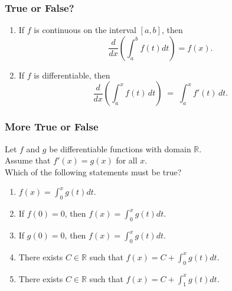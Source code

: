 \begin{frame}[t]
	\fontsize{13}{13}\selectfont
	\frametitle{True or False?}

	\begin{enumerate}
		\item If $f$ is continuous on the interval $[a,b]$, then
			\[
				\frac{d}{dx}\left( \int_{a}^{b}f(t)dt\right)=f(x).
			\]

			\vspace{4mm}

		\item If $f$ is differentiable, then
			\[
				\frac{d}{dx}\left(\int_{a}^{x}f(t)\,dt \right) \; = \; \int_{a}^{x}f'(t)
				\,dt .
			\]
	\end{enumerate}
\end{frame}

\begin{frame}[t]
	\fontsize{13}{13}\selectfont
	\frametitle{More True or False}

	Let $f$ and $g$ be differentiable functions with domain $\displaystyle \mathbb{R}$.
	\\ Assume that $\displaystyle f'(x) = g(x)$ for all $x$. \\ Which of the following
	statements must be true?

	\begin{enumerate}
		\item $\displaystyle f(x) = \int_{0}^{x}g(t) dt$.

		\item If $\displaystyle f(0)=0$, then
			$\displaystyle f(x) = \int_{0}^{x}g(t) dt$.

		\item If $\displaystyle g(0)=0$, then
			$\displaystyle f(x) = \int_{0}^{x}g(t) dt$.

		\item There exists $C \in \mathbb{R}$ such that $\displaystyle f(x) = C + \int
			_{0}^{x}g(t) dt$.

		\item There exists $C\in \mathbb{R}$ such that $\displaystyle f(x) = C + \int
			_{1}^{x}g(t) dt$.
	\end{enumerate}
\end{frame}

